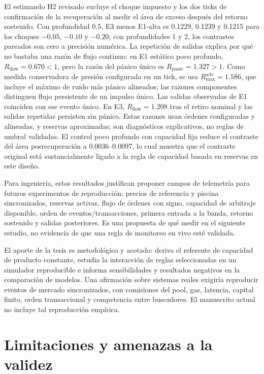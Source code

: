 El estimando H2 revisado excluye el choque impuesto y los dos ticks de confirmación de la recuperación al medir el área de exceso después del retorno sostenido. Con profundidad 0.5, E3 menos E1-alta es 0.1229, 0.1239 y 0.1215 para los choques $-0.05$, $-0.10$ y $-0.20$; con profundidades 1 y 2, los contrastes pareados son cero a precisión numérica. La repetición de salidas explica por qué no bastaba una razón de flujo continuo: en E1 estático poco profundo, $R_{\mathrm{flow}}=0.670<1$, pero la razón del pánico único es $R_{\mathrm{panic}}=1.327>1$. Como medida conservadora de presión configurada en un tick, se usa $R_{\max}^{\mathrm{adv}}=1.586$, que incluye el máximo de ruido más pánico alineados; las razones componentes distinguen flujo persistente de un impulso único. Las salidas observadas de E1 coinciden con ese evento único. En E3, $R_{\mathrm{flow}}=1.208$ tras el retiro nominal y las salidas repetidas persisten sin pánico. Estas razones usan órdenes configuradas y alineadas, y reservas aproximadas; son diagnósticos explicativos, no reglas de umbral validadas. El control poco profundo con capacidad fija reduce el contraste del área posrecuperación a 0.0036--0.0097, lo cual muestra que el contraste original está sustancialmente ligado a la regla de capacidad basada en reservas en este diseño.

Para ingeniería, estos resultados justifican proponer campos de telemetría para futuros experimentos de reproducción: precios de referencia y piscina sincronizados, reservas activas, flujo de órdenes con signo, capacidad de arbitraje disponible, orden de eventos/transacciones, primera entrada a la banda, retorno sostenido y salidas posteriores. Es una propuesta de qué medir en el siguiente estudio, no evidencia de que una regla de monitoreo en vivo esté validada.

El aporte de la tesis es metodológico y acotado: deriva el referente de capacidad de producto constante, estudia la interacción de reglas seleccionadas en un simulador reproducible e informa sensibilidades y resultados negativos en la comparación de modelos. Una afirmación sobre sistemas reales exigiría reproducir eventos de mercado sincronizados, con comisiones del pool, gas, latencia, capital finito, orden transaccional y competencia entre buscadores. El manuscrito actual no incluye tal reproducción empírica.

\section{Limitaciones y amenazas a la validez}

